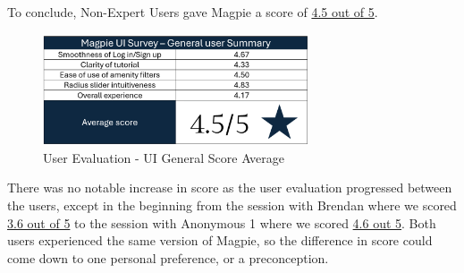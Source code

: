 \newpage{}

To conclude, Non-Expert Users gave Magpie a score of \underline{4.5 out of 5}.
\begin{figure}[h!]
  \centering
  \includegraphics[width=0.7\textwidth]{images/survey-casual-summary.png}
  \caption{User Evaluation - UI General Score Average}
\end{figure}

There was no notable increase in score as the user evaluation progressed between
the users, except in the beginning from the session with Brendan where we scored
\underline{3.6 out of 5} to the session with Anonymous 1 where we scored
\underline{4.6 out 5}. Both users experienced the same version of Magpie, so the
difference in score could come down to one personal preference, or a preconception.